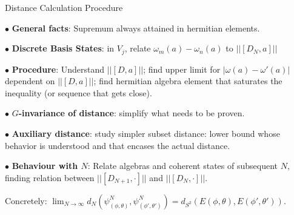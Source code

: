 \begin{frame}{Distance Calculation Procedure} %
    
     $\bullet$ \textbf{General facts}: Supremum always attained in hermitian elements.
     
     $\bullet$ \textbf{Discrete Basis States}: in $V_j$, relate $\omega_m(a) - \omega_n(a)$ to $||[D_N, a]||$
     
     $\bullet$ \textbf{Procedure}: Understand $||[D, a]||$; find upper limit for $|\omega(a) - \omega'(a)|$ dependent on $||[D, a]||$; find hermitian algebra element that saturates the inequality (or sequence that gets close). 

    $\bullet$ \textbf{$G$-invariance of distance}: simplify what needs to be proven.
    
    $\bullet$ \textbf{Auxiliary distance}: study simpler subset distance: lower bound whose behavior is understood and that encases the actual distance.
    
    $\bullet$ \textbf{Behaviour with $N$}: Relate algebras and coherent states of subsequent $N$, finding relation between $||[D_{N+1}, \cdot]||$ and $||[D_N, \cdot]||$.
    
    Concretely: $\lim_{N \to \infty} d_N(\psi^N_{(\phi, \theta)}, \psi^N_{(\phi', \theta')}) = d_{S^2}(E(\phi, \theta), E(\phi', \theta')).$
\end{frame}